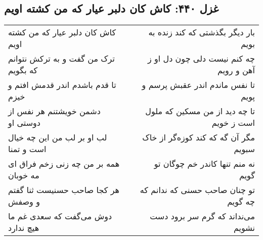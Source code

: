 \begin{center}
\section*{غزل ۴۴۰: کاش کان دلبر عیار که من کشته اویم}
\label{sec:440}
\begin{longtable}{l p{0.5cm} r}
کاش کان دلبر عیار که من کشته اویم
&&
بار دیگر بگذشتی که کند زنده به بویم
\\
ترک من گفت و به ترکش نتوانم که بگویم
&&
چه کنم نیست دلی چون دل او ز آهن و رویم
\\
تا قدم باشدم اندر قدمش افتم و خیزم
&&
تا نفس ماندم اندر عقبش پرسم و پویم
\\
دشمن خویشتنم هر نفس از دوستی او
&&
تا چه دید از من مسکین که ملول است ز خویم
\\
لب او بر لب من این چه خیال است و تمنا
&&
مگر آن گه که کند کوزه‌گر از خاک سبویم
\\
همه بر من چه زنی زخم فراق ای مه خوبان
&&
نه منم تنها کاندر خم چوگان تو گویم
\\
هر کجا صاحب حسنیست ثنا گفتم و وصفش
&&
تو چنان صاحب حسنی که ندانم که چه گویم
\\
دوش می‌گفت که سعدی غم ما هیچ ندارد
&&
می‌نداند که گرم سر برود دست نشویم
\\
\end{longtable}
\end{center}
